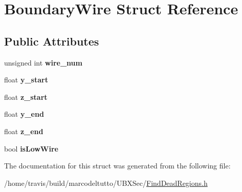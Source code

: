 \hypertarget{structBoundaryWire}{\section{\-Boundary\-Wire \-Struct \-Reference}
\label{structBoundaryWire}
}
\subsection*{\-Public \-Attributes}
\begin{DoxyCompactItemize}
\item 
\hypertarget{structBoundaryWire_aea1c09c6f1af43423698dd4d9ca0b86f}{unsigned int {\bfseries wire\-\_\-num}}\label{structBoundaryWire_aea1c09c6f1af43423698dd4d9ca0b86f}

\item 
\hypertarget{structBoundaryWire_a6969e3a2ea00f7a7f10e7a2a6add17a0}{float {\bfseries y\-\_\-start}}\label{structBoundaryWire_a6969e3a2ea00f7a7f10e7a2a6add17a0}

\item 
\hypertarget{structBoundaryWire_ac18920460b74370ddfaca7aaf2089283}{float {\bfseries z\-\_\-start}}\label{structBoundaryWire_ac18920460b74370ddfaca7aaf2089283}

\item 
\hypertarget{structBoundaryWire_a280aaa480170ff5f75b551e00993dc41}{float {\bfseries y\-\_\-end}}\label{structBoundaryWire_a280aaa480170ff5f75b551e00993dc41}

\item 
\hypertarget{structBoundaryWire_a5b3e58ad04ba75fb7c77cdb50cea3686}{float {\bfseries z\-\_\-end}}\label{structBoundaryWire_a5b3e58ad04ba75fb7c77cdb50cea3686}

\item 
\hypertarget{structBoundaryWire_a8ad92872ad08d86d9047a96d36255090}{bool {\bfseries is\-Low\-Wire}}\label{structBoundaryWire_a8ad92872ad08d86d9047a96d36255090}

\end{DoxyCompactItemize}


\-The documentation for this struct was generated from the following file\-:\begin{DoxyCompactItemize}
\item 
/home/travis/build/marcodeltutto/\-U\-B\-X\-Sec/\hyperlink{FindDeadRegions_8h}{\-Find\-Dead\-Regions.\-h}\end{DoxyCompactItemize}

